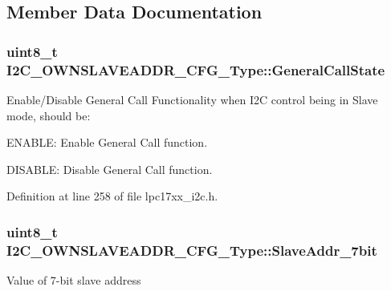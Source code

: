 \subsection{\-Member \-Data \-Documentation}
\hypertarget{struct_i2_c___o_w_n_s_l_a_v_e_a_d_d_r___c_f_g___type_a7854696cf45e880ce3602d3c020fcdb5}{
\subsubsection[{\-General\-Call\-State}]{\setlength{\rightskip}{0pt plus 5cm}uint8\-\_\-t {\bf \-I2\-C\-\_\-\-O\-W\-N\-S\-L\-A\-V\-E\-A\-D\-D\-R\-\_\-\-C\-F\-G\-\_\-\-Type\-::\-General\-Call\-State}}}\label{struct_i2_c___o_w_n_s_l_a_v_e_a_d_d_r___c_f_g___type_a7854696cf45e880ce3602d3c020fcdb5}
\-Enable/\-Disable \-General \-Call \-Functionality when \-I2\-C control being in \-Slave mode, should be\-:
\begin{DoxyItemize}
\item \-E\-N\-A\-B\-L\-E\-: \-Enable \-General \-Call function.
\item \-D\-I\-S\-A\-B\-L\-E\-: \-Disable \-General \-Call function. 
\end{DoxyItemize}

\-Definition at line 258 of file lpc17xx\-\_\-i2c.\-h.

\hypertarget{struct_i2_c___o_w_n_s_l_a_v_e_a_d_d_r___c_f_g___type_a68d407a41be44644ce3ee911f59bc870}{
\subsubsection[{\-Slave\-Addr\-\_\-7bit}]{\setlength{\rightskip}{0pt plus 5cm}uint8\-\_\-t {\bf \-I2\-C\-\_\-\-O\-W\-N\-S\-L\-A\-V\-E\-A\-D\-D\-R\-\_\-\-C\-F\-G\-\_\-\-Type\-::\-Slave\-Addr\-\_\-7bit}}}\label{struct_i2_c___o_w_n_s_l_a_v_e_a_d_d_r___c_f_g___type_a68d407a41be44644ce3ee911f59bc870}
\-Value of 7-\/bit slave address 

